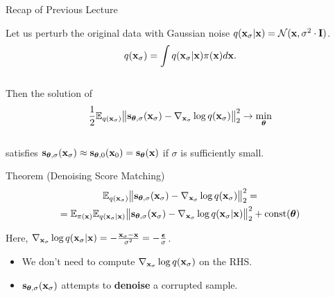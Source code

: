 \documentclass{beamer}
\begin{document}
\begin{frame}
\titlepage
    \resetonslide
\end{frame}
\begin{frame}{Recap of Previous Lecture}

    Let us perturb the original data with Gaussian noise $q(\mathbf{x}_{\sigma} | \mathbf{x}) = \mathcal{N}(\mathbf{x}, \sigma^2 \cdot \mathbf{I})$.
    \vspace{-0.3cm}
    \[
        q(\mathbf{x}_{\sigma}) = \int q(\mathbf{x}_{\sigma} | \mathbf{x}) \pi(\mathbf{x}) d\mathbf{x}.
    \]
    \vspace{-0.6cm} \\
    Then the solution of 
    \vspace{-0.2cm}
    \[
        \frac{1}{2} \mathbb{E}_{q(\mathbf{x}_{\sigma})}\bigl\| \mathbf{s}_{\boldsymbol{\theta}, \sigma}(\mathbf{x}_{\sigma}) - \nabla_{\mathbf{x}_{\sigma}} \log q(\mathbf{x}_{\sigma}) \bigr\|^2_2 \rightarrow \min_{\boldsymbol{\theta}}
    \]
    \vspace{-0.5cm} \\
    satisfies $\mathbf{s}_{\boldsymbol{\theta}, \sigma}(\mathbf{x}_{\sigma}) \approx \mathbf{s}_{\boldsymbol{\theta}, 0}(\mathbf{x}_0) = \mathbf{s}_{\boldsymbol{\theta}}(\mathbf{x})$ if $\sigma$ is sufficiently small.
    \begin{block}{Theorem (Denoising Score Matching)}
        \vspace{-0.8cm}
        \begin{multline*}
            \mathbb{E}_{q(\mathbf{x}_{\sigma})}\bigl\| \mathbf{s}_{\boldsymbol{\theta}, \sigma}(\mathbf{x}_{\sigma}) - \nabla_{\mathbf{x}_{\sigma}} \log q(\mathbf{x}_{\sigma}) \bigr\|^2_2 = \\ = \mathbb{E}_{\pi(\mathbf{x})} \mathbb{E}_{q(\mathbf{x}_{\sigma} | \mathbf{x})}\bigl\| \mathbf{s}_{\boldsymbol{\theta}, \sigma}(\mathbf{x}_{\sigma}) - \nabla_{\mathbf{x}_{\sigma}} \log q(\mathbf{x}_{\sigma} | \mathbf{x}) \bigr\|^2_2 + \text{const}(\boldsymbol{\theta})
        \end{multline*}
        \vspace{-0.7cm}
    \end{block}
    Here, $\nabla_{\mathbf{x}_{\sigma}} \log q(\mathbf{x}_{\sigma} | \mathbf{x}) = - \frac{\mathbf{x}_{\sigma} - \mathbf{x}}{\sigma^2} = - \frac{\boldsymbol{\epsilon}}{\sigma}$.
    \begin{itemize}
        \item We don't need to compute $\nabla_{\mathbf{x}_{\sigma}} \log q(\mathbf{x}_{\sigma})$ on the RHS.
        \item $\mathbf{s}_{\boldsymbol{\theta}, \sigma}(\mathbf{x}_{\sigma})$ attempts to \textbf{denoise} a corrupted sample.
    \end{itemize}
\end{frame}
\end{document}
